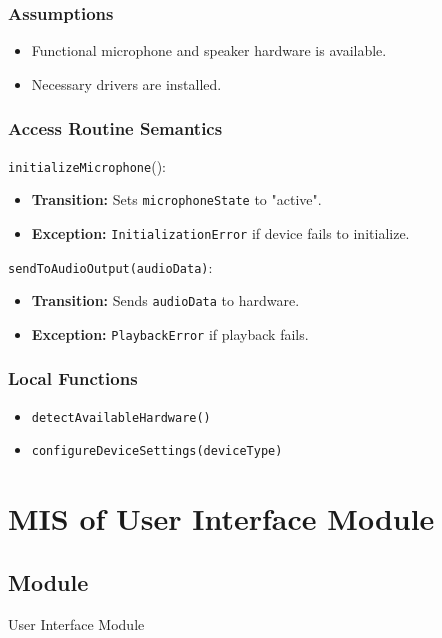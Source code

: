 \documentclass[12pt, titlepage]{article}
\begin{document}
\subsubsection{Assumptions}  
\begin{itemize}  
    \item Functional microphone and speaker hardware is available.  
    \item Necessary drivers are installed.  
\end{itemize}  

\subsubsection{Access Routine Semantics}  

\noindent \texttt{initializeMicrophone}():
\begin{itemize}  
    \item \textbf{Transition:} Sets \texttt{microphoneState} to "active".  
    \item \textbf{Exception:} \texttt{InitializationError} if device fails to initialize.  
\end{itemize}  

\noindent \texttt{sendToAudioOutput(audioData)}:
\begin{itemize}  
    \item \textbf{Transition:} Sends \texttt{audioData} to hardware.  
    \item \textbf{Exception:} \texttt{PlaybackError} if playback fails.  
\end{itemize}  

\subsubsection{Local Functions}  
\begin{itemize}  
    \item \texttt{detectAvailableHardware()}  
    \item \texttt{configureDeviceSettings(deviceType)}  
\end{itemize}  

\section{MIS of User Interface Module} \label{M2}  

\subsection{Module}  
User Interface Module  
\end{document}
